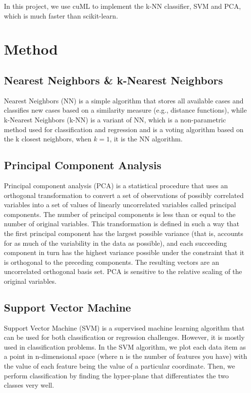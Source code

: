 \documentclass[11pt]{article}
\begin{document}
In this project, we use cuML to implement the k-NN classifier, SVM and PCA, which is much faster than scikit-learn.
\section{Method}

\subsection{Nearest Neighbors \& k-Nearest Neighbors}

Nearest Neighbors (NN) is a simple algorithm that stores all available cases and classifies new cases based on a similarity measure (e.g., distance functions), 
while k-Nearest Neighbors (k-NN) is a variant of NN, which is a non-parametric method used for classification and regression and is a voting algorithm based on the k closest neighbors, 
when $k=1$, it is the NN algorithm.

\subsection{Principal Component Analysis}
Principal component analysis (PCA) is a statistical procedure that uses an orthogonal transformation to convert a set of observations of possibly correlated variables into a set of values of linearly uncorrelated variables called principal components. The number of principal components is less than or equal to the number of original variables. This transformation is defined in such a way that the first principal component has the largest possible variance (that is, accounts for as much of the variability in the data as possible), and each succeeding component in turn has the highest variance possible under the constraint that it is orthogonal to the preceding components. The resulting vectors are an uncorrelated orthogonal basis set. PCA is sensitive to the relative scaling of the original variables.

\subsection{Support Vector Machine}

Support Vector Machine (SVM) is a supervised machine learning algorithm that can be used for both classification or regression challenges. However, it is mostly used in classification problems. In the SVM algorithm, we plot each data item as a point in n-dimensional space (where n is the number of features you have) with the value of each feature being the value of a particular coordinate. Then, we perform classification by finding the hyper-plane that differentiates the two classes very well.
\end{document}
